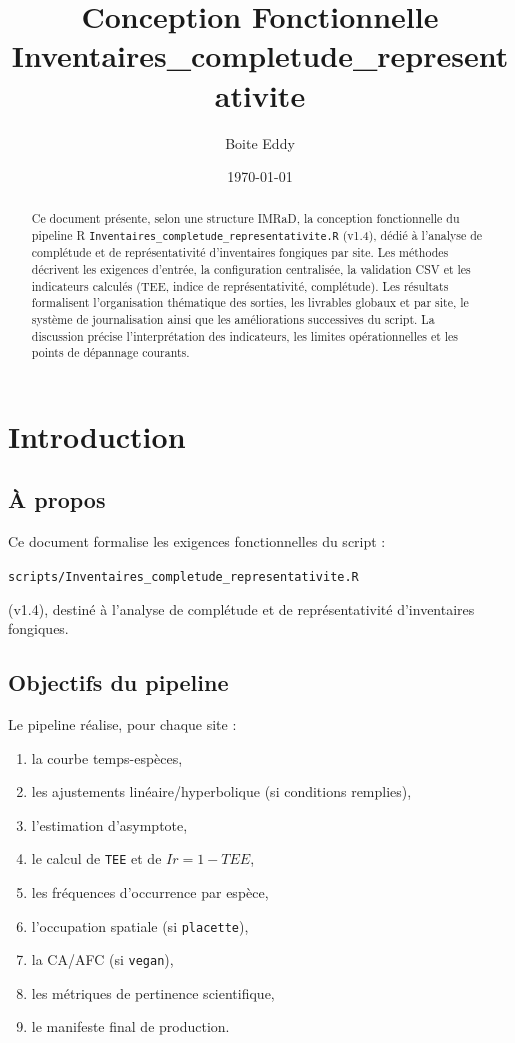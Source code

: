 \documentclass[11pt,a4paper]{article}
\title{Conception Fonctionnelle\\
\large Inventaires\_completude\_representativite}
\author{Boite Eddy}
\date{\today}
\begin{document}
\maketitle

\begin{abstract}
Ce document présente, selon une structure IMRaD, la conception fonctionnelle du pipeline R
\texttt{Inventaires\_completude\_representativite.R} (v1.4), dédié à l'analyse de complétude et
de représentativité d'inventaires fongiques par site. Les méthodes décrivent les exigences
d'entrée, la configuration centralisée, la validation CSV et les indicateurs calculés
(TEE, indice de représentativité, complétude). Les résultats formalisent l'organisation
thématique des sorties, les livrables globaux et par site, le système de journalisation ainsi
que les améliorations successives du script. La discussion précise l'interprétation des
indicateurs, les limites opérationnelles et les points de dépannage courants.
\end{abstract}
\tableofcontents
\newpage

\section{Introduction}

\subsection{À propos}
Ce document formalise les exigences fonctionnelles du script :

\begin{center}
  \texttt{scripts/Inventaires\_completude\_representativite.R}
\end{center}

(v1.4), destiné à l'analyse de complétude et de représentativité d'inventaires fongiques.

\subsection{Objectifs du pipeline}

Le pipeline réalise, pour chaque site :

\begin{enumerate}[label=\arabic*.]
  \item la courbe temps-espèces,
  \item les ajustements linéaire/hyperbolique (si conditions remplies),
  \item l'estimation d'asymptote,
  \item le calcul de \texttt{TEE} et de $Ir = 1 - TEE$,
  \item les fréquences d'occurrence par espèce,
  \item l'occupation spatiale (si \texttt{placette}),
  \item la CA/AFC (si \texttt{vegan}),
  \item les métriques de pertinence scientifique,
  \item le manifeste final de production.
\end{enumerate}
\end{document}
